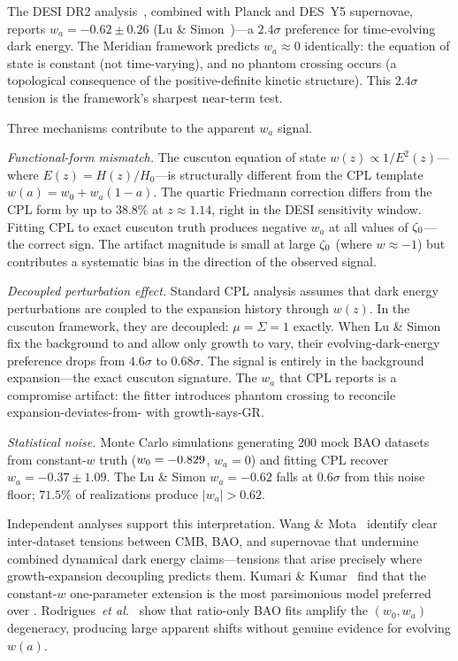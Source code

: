 The DESI DR2 analysis~\cite{ch1:desi25}, combined with Planck and
DES~Y5 supernovae, reports $w_a = -0.62 \pm 0.26$
(Lu \& Simon~\cite{ch2:LuSimon2026})---a $2.4\sigma$ preference for
time-evolving dark energy. The Meridian framework predicts
$w_a \approx 0$ identically: the equation of state is constant (not
time-varying), and no phantom crossing occurs (a topological
consequence of the positive-definite kinetic structure). This
$2.4\sigma$ tension is the framework's sharpest near-term test.

Three mechanisms contribute to the apparent $w_a$ signal.

\textit{Functional-form mismatch.} The cuscuton equation of state
$w(z) \propto 1/E^2(z)$---where $E(z) = H(z)/H_0$---is structurally
different from the CPL template $w(a) = w_0 + w_a(1 - a)$. The quartic
Friedmann correction differs from the CPL form by up to $38.8\%$ at
$z \approx 1.14$, right in the DESI sensitivity window. Fitting CPL to
exact cuscuton truth produces negative $w_a$ at all values of $\zeta_0$---
the correct sign. The artifact magnitude is small at large $\zeta_0$ (where
$w \approx -1$) but contributes a systematic bias in the direction of
the observed signal.

\textit{Decoupled perturbation effect.} Standard CPL analysis assumes
that dark energy perturbations are coupled to the expansion history
through $w(z)$. In the cuscuton framework, they are decoupled:
$\mu = \Sigma = 1$ exactly. When Lu \& Simon fix the background to
\LCDM{} and allow only growth to vary, their evolving-dark-energy
preference drops from $4.6\sigma$ to $0.68\sigma$. The signal is
entirely in the background expansion---the exact cuscuton signature.
The $w_a$ that CPL reports is a compromise artifact: the fitter
introduces phantom crossing to reconcile expansion-deviates-from-\LCDM{}
with growth-says-GR.

\textit{Statistical noise.} Monte Carlo simulations generating 200
mock BAO datasets from constant-$w$ truth ($w_0 = -0.829$, $w_a = 0$)
and fitting CPL recover $w_a = -0.37 \pm 1.09$. The Lu \& Simon
$w_a = -0.62$ falls at $0.6\sigma$ from this noise floor; $71.5\%$ of
realizations produce $|w_a| > 0.62$.

Independent analyses support this interpretation. Wang \&
Mota~\cite{ch2:WangMota2025} identify clear inter-dataset tensions
between CMB, BAO, and supernovae that undermine combined dynamical
dark energy claims---tensions that arise precisely where
growth-expansion decoupling predicts them. Kumari \&
Kumar~\cite{ch2:KumariKumar2026} find that the constant-$w$
one-parameter extension is the most parsimonious model preferred over
\LCDM. Rodrigues~\textit{et al.}~\cite{ch2:Rodrigues2025} show that
ratio-only BAO fits amplify the $(w_0, w_a)$ degeneracy, producing
large apparent shifts without genuine evidence for evolving $w(a)$.

